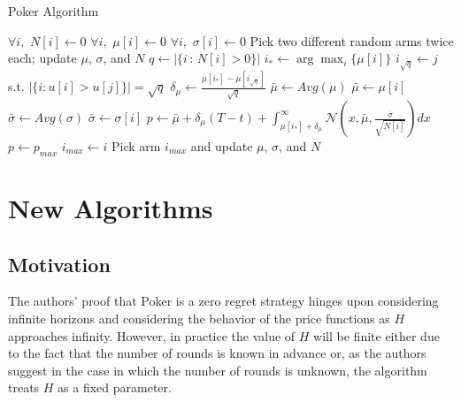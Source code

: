 \documentclass[12pt]{article}
\begin{document}
\begin{algorithm}[H]
\scriptsize
  \caption{Poker Algorithm}
  \begin{algorithmic}
  \State $\forall i, \, \, N[i] \gets 0$ 
  \State $\forall i, \, \, \mu[i] \gets 0$ 
  \State $\forall i, \, \, \sigma[i] \gets 0$ 
  \State
  \State Pick two different random arms twice each; update $\mu$, $\sigma$, and $N$
        \State $q \gets |\{i \, : \, N[i] > 0\}|$
        \State $i_{*} \gets \arg \max_{i} \{\mu[i]\}$
        \State $i_{\sqrt{q}} \gets j$ s.t. $|\{i : u[i] > u[j]\}| = \sqrt{q}$
        \State $\delta_{\mu} \gets \frac{\mu[i_{*}] - \mu[i_{\sqrt{q}}]}{\sqrt{q}}$ 
                \State $\bar{\mu} \gets Avg(\mu)$ 
            \Else 
                \State $\bar{\mu} \gets \mu[i]$ 
            \EndIf
                \State $\bar{\sigma} \gets Avg(\sigma)$ 
            \Else
                \State $\bar{\sigma} \gets \sigma[i]$ 
            \EndIf
        \State $p \gets \bar{\mu} + \delta_{\mu}(T - t) + \int_{\mu[i_*] + \delta_{\mu}}^{\infty} \mathcal{N}\left(x, \bar{\mu}, \frac{\bar{\sigma}}{\sqrt{N[i]}} \right) dx$
            \State$p \gets p_{max}$
            \State $i_{max} \gets i$ 
        \EndIf
        \EndFor
        \State Pick arm $i_{max}$ and update $\mu$, $\sigma$, and $N$
    \EndFor
  \end{algorithmic}
\end{algorithm}


\section{New Algorithms}

\subsection{Motivation}

The authors' proof that Poker is a zero regret strategy hinges upon considering infinite horizons and considering the behavior of the price functions as $H$ approaches infinity. However, in practice the value of $H$ will be finite either due to the fact that the number of rounds is known in advance or, as the authors suggest in the case in which the number of rounds is unknown, the algorithm treats $H$ as a fixed parameter.
\end{document}
